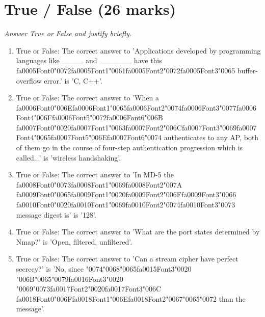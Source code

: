 \documentclass[12pt]{article}
\begin{document}
\section*{True / False (26 marks)}
\textit{Answer True or False and justify briefly.}
\begin{enumerate}[label=\arabic*.]
\item True or False: The correct answer to 'Applications developed by programming languages like \_\_\_\_ and \_\_\_\_\_\_ have this {\csname fa0005Font0\endcsname\char"0072}{\csname fa0005Font1\endcsname\char"0061}{\csname fa0005Font2\endcsname\char"0072}{\csname fa0005Font3\endcsname\char"0065} buffer-overflow error.' is 'C, C++'.
\item True or False: The correct answer to 'When a {\csname fa0006Font0\endcsname\char"006E}{\csname fa0006Font1\endcsname\char"0065}{\csname fa0006Font2\endcsname\char"0074}{\csname fa0006Font3\endcsname\char"0077}{\csname fa0006Font4\endcsname\char"006F}{\csname fa0006Font5\endcsname\char"0072}{\csname fa0006Font6\endcsname\char"006B} {\csname fa0007Font0\endcsname\char"0020}{\csname fa0007Font1\endcsname\char"0063}{\csname fa0007Font2\endcsname\char"006C}{\csname fa0007Font3\endcsname\char"0069}{\csname fa0007Font4\endcsname\char"0065}{\csname fa0007Font5\endcsname\char"006E}{\csname fa0007Font6\endcsname\char"0074} authenticates to any AP, both of them go in the course of four-step authentication progression which is called...' is 'wireless handshaking'.
\item True or False: The correct answer to 'In MD-5 the {\csname fa0008Font0\endcsname\char"0073}{\csname fa0008Font1\endcsname\char"0069}{\csname fa0008Font2\endcsname\char"007A} {\csname fa0009Font0\endcsname\char"0065}{\csname fa0009Font1\endcsname\char"0020}{\csname fa0009Font2\endcsname\char"006F}{\csname fa0009Font3\endcsname\char"0066} {\csname fa0010Font0\endcsname\char"0020}{\csname fa0010Font1\endcsname\char"0069}{\csname fa0010Font2\endcsname\char"0074}{\csname fa0010Font3\endcsname\char"0073} message digest is' is '128'.
\item True or False: The correct answer to 'What are the port states determined by Nmap?' is 'Open, filtered, unfiltered'.
\item True or False: The correct answer to 'Can a stream cipher have perfect secrecy?' is 'No, since {\char"0074}{\char"0068}{\char"0065}{\csname fa0015Font3\endcsname\char"0020} {\char"006B}{\char"0065}{\char"0079}{\csname fa0016Font3\endcsname\char"0020} {\char"0069}{\char"0073}{\csname fa0017Font2\endcsname\char"0020}{\csname fa0017Font3\endcsname\char"006C} {\csname fa0018Font0\endcsname\char"006F}{\csname fa0018Font1\endcsname\char"006E}{\csname fa0018Font2\endcsname\char"0067}{\char"0065}{\char"0072} than the message'.

\end{enumerate}
\end{document}
